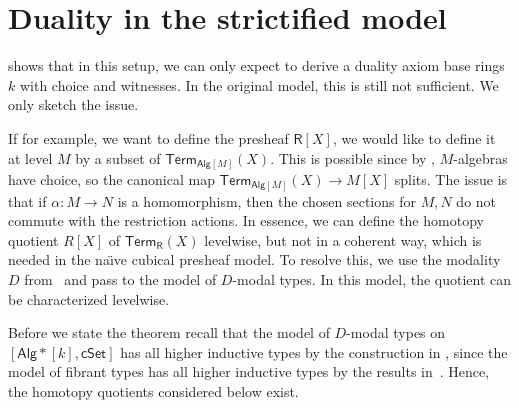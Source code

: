 \documentclass[10pt,a4paper]{article}
\theoremstyle{definition}
\theoremstyle{remark}
\newcommand{\cSet}{\mathsf{cSet}}
\newcommand{\Alg}{\mathsf{Alg}}
\newcommand\R{\mathsf{R}}
\newcommand\Term{\mathsf{Term}}
\begin{document}
\section{Duality in the strictified model}\label{sec:duality-in-model-of-modal-types}

 shows that in this setup, we can only expect to derive a duality axiom base rings \(k\) with choice and witnesses.
In the original model, this is still not sufficient.
We only sketch the issue.

If for example, we want to define the presheaf \(\R[X]\), we would like to define it at level \(M\) by a subset of \(\Term_{\Alg[M]}(X)\).
This is possible since by , \(M\)-algebras have choice, so the canonical map \(\Term_{\Alg[M]}(X) \to M[X]\) splits.
The issue is that if \(\alpha \colon M \to N\) is a homomorphism, then the chosen sections for \(M, N\) do not commute with the restriction actions.
In essence, we can define the homotopy quotient \(R[X]\) of \(\Term_{\R}(X)\) levelwise, but not in a coherent way, which is needed in the na{\"\i}ve cubical presheaf model.
To resolve this, we use the modality \(D\) from~\cite{CRS21} and pass to the model of \(D\)-modal types.
In this model, the quotient can be characterized levelwise.

Before we state the theorem recall that the model of \(D\)-modal types on \([\Alg*[k], \cSet]\) has all higher inductive types by the construction in \cite{CRS21}, since the model of fibrant types has all higher inductive types by the results in~\cite{CoquandHM18}.
Hence, the homotopy quotients considered below exist.
\end{document}
